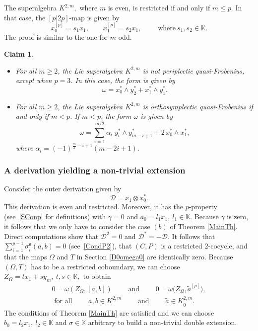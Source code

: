 \documentclass[10pt,a4paper]{amsart}
\numberwithin{equation}{section}
\newtheorem{Claim}[Theorem]{Claim}
\begin{document}
The superalgebra $K^{2,m},$ where $m$ is even, is restricted if and only if $m\leq p$. In that case, the $[p|2p]$-map is given by
\[
x_0^{[p]}=s_1 x_1, \qquad x_1^{[p]}=s_2 x_1,\qquad \text{ where}\ s_1, s_2\in \mathbb K.
\] The proof is similar to the one for $m$ odd.

\begin{Claim}\quad
 \begin{itemize}\itemsep=0pt\item[$(i)$] For all $m\geq 2$, the Lie superalgebra $K^{2,m}$ is not periplectic quasi-Frobenius, except when ${p=3}$. In this case, the form is given by
\[\omega=x_{0}^* \wedge y_{2}^*+x_{1}^* \wedge y_{1}^*.\]
\item[$(ii)$]For all $m\geq 2$, the Lie superalgebra $K^{2,m}$ is orthosymplectic quasi-Frobenius if and only if $m<p$. If $m<p$, the form $\omega$ is given by
\[
\omega= \sum_{i=1}^{m/2} \alpha_i \; y_{i}^* \wedge y_{m-i+1}^* +2\, x_0^*\wedge x_1^*,
\]
where $\alpha_{i}= (-1)^{\frac{m}{2}-i+1} (m-2i+1)$.
\end{itemize}
\end{Claim}
\subsubsection{A derivation yielding a non-trivial extension} Consider the outer derivation given by
\[
{\mathscr D}=x_1\otimes x_0^*.
\]
This derivation is even and restricted. Moreover, it has the $p$-property (see~\eqref{SConp} for definitions) with $\gamma=0$ and $a_0=l_1x_1,~l_1\in\mathbb K$. Because $\gamma$ is zero, it follows that we only have to consider the case $(b)$ of Theorem \ref{MainTh}. Direct computations show that ${\mathscr D}^2=0$ and ${\mathscr D}^*=-{\mathscr D}$. It follows that $\sum_{i=1}^{p-1}\sigma_i^{\mathfrak{a}}(a,b)=0$ (see~\eqref{CondP2}), that $(C,P)$ is a restricted $2$-cocycle, and that the maps $\Omega$ and $T$ in Section \ref{D0omega0} are identically zero. Because $(\Omega,T)$ has to be a restricted coboundary, we can choose $Z_{\Omega}=tx_1+sy_m,~t,s\in\mathbb K,$ to obtain
\begin{gather*}
0=\omega(Z_{\Omega},[a,b])\qquad \text{ and }\qquad 0=\omega\bigl(Z_{\Omega},\tilde{a}^{[p]}\bigr),\\
\text{ for all }\qquad a,b\in K^{2,m}\qquad \text{ and }\qquad \tilde{a} \in K^{2,m}_{\bar{0}}.
\end{gather*}
 The conditions of Theorem \ref{MainTh} are satisfied and we can choose $b_0=l_2x_1,~l_2\in \mathbb K$ and $\sigma\in \mathbb K$ arbitrary to build a non-trivial double extension.
\end{document}
